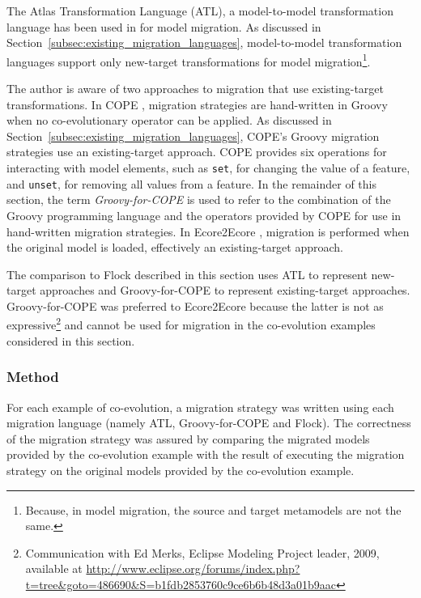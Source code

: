 The Atlas Transformation Language (ATL), a model-to-model transformation language has been used in \cite{cicchetti08automating,garces09managing} for model migration. As discussed in Section~\ref{subsec:existing_migration_languages}, model-to-model transformation languages support only new-target transformations for model migration\footnote{Because, in model migration, the source and target metamodels are not the same.}.

The author is aware of two approaches to migration that use existing-target transformations. In COPE \cite{herrmannsdoerfer09cope}, migration strategies are hand-written in Groovy when no co-evolutionary operator can be applied. As discussed in Section~\ref{subsec:existing_migration_languages}, COPE's Groovy migration strategies use an existing-target approach. COPE provides six operations for interacting with model elements, such as \texttt{set}, for changing the value of a feature, and \texttt{unset}, for removing all values from a feature. In the remainder of this section, the term \emph{Groovy-for-COPE} is used to refer to the combination of the Groovy programming language and the operators provided by COPE for use in hand-written migration strategies. In Ecore2Ecore \cite{hussey06advanced}, migration is performed when the original model is loaded, effectively an existing-target approach.

The comparison to Flock described in this section uses ATL to represent new-target approaches and Groovy-for-COPE to represent existing-target approaches. Groovy-for-COPE was preferred to Ecore2Ecore because the latter is not as expressive\footnote{Communication with Ed Merks, Eclipse Modeling Project leader, 2009, available at \url{http://www.eclipse.org/forums/index.php?t=tree&goto=486690&S=b1fdb2853760c9ce6b6b48d3a01b9aac}} and cannot be used for migration in the co-evolution examples considered in this section.

\subsubsection{Method}
\label{subsubsec:quantitive_method}
For each example of co-evolution, a migration strategy was written using each migration language (namely ATL, Groovy-for-COPE and Flock). The correctness of the migration strategy was assured by comparing the migrated models provided by the co-evolution example with the result of executing the migration strategy on the original models provided by the co-evolution example.

